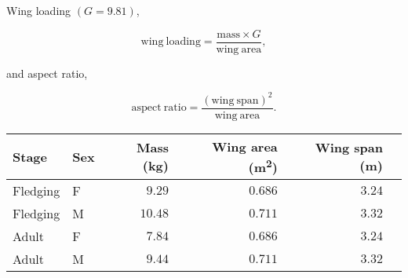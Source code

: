 \documentclass[12pt, addpoints, hidelinks]{exam}
\begin{document}
\begin{multicols}{2}
	
Wing loading  $(G = 9.81)$,

\[ \mathrm{wing~loading} = \frac{\mathrm{mass} \times G}{\mathrm{wing~area}},\]

\columnbreak

 and aspect ratio, 

\[\mathrm{aspect~ratio} = \frac{\mathrm{(wing~span)}^2}{\mathrm{wing~area}}.\]
	
\end{multicols}



\begin{tabular}{@{}llrrrr@{}}
\toprule
Stage & Sex & Mass (kg) & Wing area (\unit{\meter^2}) & Wing span (\unit{\meter}) \\
\midrule
Fledging	&	F	&	$9.29$ & $0.686$	&	$3.24$ & 	\\
Fledging		&	M 	&	$10.48$ &	$0.711$ &	$3.32$ & 	\\
Adult	&	F	&	$7.84$ & $0.686$	& $3.24$	& 	\\
Adult		&	M 	& $9.44$	& $0.711$	& $3.32$	& 	\\
\bottomrule
\end{tabular}

\bigskip
\end{document}
